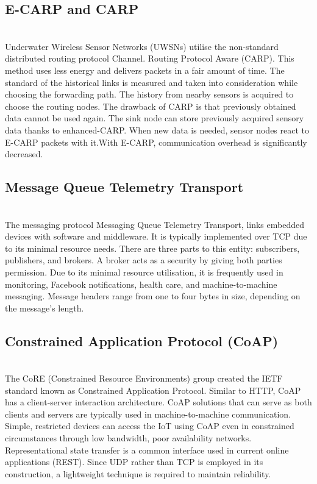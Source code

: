 \documentclass{article}
\begin{document}
\subsection{E-CARP and CARP}
\\
Underwater Wireless Sensor Networks (UWSNs) utilise the non-standard distributed routing protocol Channel. Routing Protocol Aware (CARP). This method uses less energy and delivers packets in a fair amount of time. The standard of the historical links is measured and taken into consideration while choosing the forwarding path. The history from nearby sensors is acquired to choose the routing nodes. The drawback of CARP is that previously obtained data cannot be used again. The sink node can store previously acquired sensory data thanks to enhanced-CARP. When new data is needed, sensor nodes react to E-CARP packets with it.With E-CARP, communication overhead is significantly decreased.
\\
\subsection{Message Queue Telemetry Transport}
\\
The messaging protocol Messaging Queue Telemetry Transport, links embedded devices with software and middleware. It is typically implemented over TCP due to its minimal resource needs. There are three parts to this entity: subscribers, publishers, and brokers. A broker acts as a security by giving both parties permission. Due to its minimal resource utilisation, it is frequently used in monitoring, Facebook notifications, health care, and machine-to-machine messaging. Message headers range from one to four bytes in size, depending on the message's length.
\\
\subsection{Constrained Application Protocol (CoAP)}
\\
The CoRE (Constrained Resource Environments) group created the IETF standard known as Constrained Application Protocol. Similar to HTTP, CoAP has a client-server interaction architecture. CoAP solutions that can serve as both clients and servers are typically used in machine-to-machine communication. Simple, restricted devices can access the IoT using CoAP even in constrained circumstances through low bandwidth, poor availability networks. Representational state transfer is a common interface used in current online applications (REST). Since UDP rather than TCP is employed in its construction, a lightweight technique is required to maintain reliability.
\\
\end{document}
